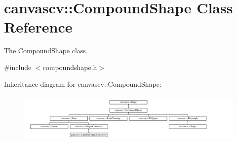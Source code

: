 \hypertarget{classcanvascv_1_1CompoundShape}{}\section{canvascv\+:\+:Compound\+Shape Class Reference}
\label{classcanvascv_1_1CompoundShape}


The \hyperlink{classcanvascv_1_1CompoundShape}{Compound\+Shape} class.  




{\ttfamily \#include $<$compoundshape.\+h$>$}

Inheritance diagram for canvascv\+:\+:Compound\+Shape\+:\begin{figure}[H]
\begin{center}
\leavevmode
\includegraphics[height=2.466960cm]{classcanvascv_1_1CompoundShape}
\end{center}
\end{figure}
